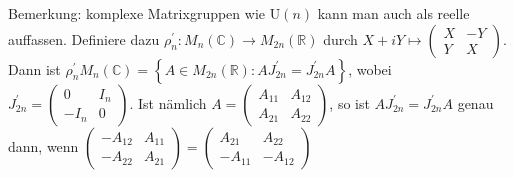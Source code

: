 \documentclass[10pt, letterpaper]{article}
\begin{document}
Bemerkung: komplexe Matrixgruppen wie $\mathrm{U}(n)$ kann man auch als reelle auffassen. Definiere dazu $\rho_{n}^{\prime}: M_{n}(\mathbb{C}) \rightarrow M_{2 n}(\mathbb{R})$ durch $X+i Y \mapsto \left(\begin{array}{cc}X & -Y \\ Y & X\end{array}\right)$. Dann ist $\rho_{n}^{\prime} M_{n}(\mathbb{C})=\left\{A \in M_{2 n}(\mathbb{R}): A J_{2 n}^{\prime}=J_{2 n}^{\prime} A\right\}$, wobei $J_{2 n}^{\prime}=\left(\begin{array}{cc}0 & I_{n} \\ -I_{n} & 0\end{array}\right)$. Ist nämlich $A=\left(\begin{array}{cc}A_{11} & A_{12} \\ A_{21} & A_{22}\end{array}\right)$, so ist $A J_{2 n}^{\prime}=J_{2 n}^{\prime} A$ genau dann, wenn $\left(\begin{array}{cc}-A_{12} & A_{11} \\ -A_{22} & A_{21}\end{array}\right)=\left(\begin{array}{cc}A_{21} & A_{22} \\ -A_{11} & -A_{12}\end{array}\right)$
\end{document}
